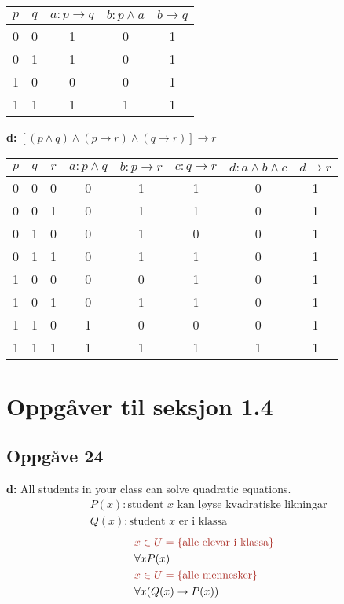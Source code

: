 \documentclass[a4paper, 11pt]{article}
\newcommand{\deloppg}[1]{\vspace{1mm}\noindent \textbf{\themecolor{#1:}}}
\newcommand{\themeshade}{Mahogany}
\newcommand{\themecolor}[1]{\textcolor{\themeshade}{#1}}
\begin{document}
\begin{tabular}{cccc|c}
    $p$ & $q$ & $a: p \rightarrow q$ & $b: p \land a$ & $b \rightarrow q$ \\
    \hline
    0   & 0   & 1                    & 0              & 1 \\
    0   & 1   & 1                    & 0              & 1 \\
    1   & 0   & 0                    & 0              & 1 \\
    1   & 1   & 1                    & 1              & 1 \\
\end{tabular}

\deloppg{d} $[(p \land q) \land (p \rightarrow r) \land (q \rightarrow r)] \rightarrow r$

\begin{tabular}{ccccccc|c}
    $p$ & $q$ & $r$ & $a: p \land q$ & $b: p \rightarrow r$
    & $c: q \rightarrow r$ & $d: a\land b\land c$ & $d \rightarrow r$ \\
    \hline
    0 & 0 & 0 & 0 & 1 & 1 & 0 & 1 \\ 
    0 & 0 & 1 & 0 & 1 & 1 & 0 & 1 \\
    0 & 1 & 0 & 0 & 1 & 0 & 0 & 1 \\
    0 & 1 & 1 & 0 & 1 & 1 & 0 & 1 \\
    1 & 0 & 0 & 0 & 0 & 1 & 0 & 1 \\
    1 & 0 & 1 & 0 & 1 & 1 & 0 & 1 \\
    1 & 1 & 0 & 1 & 0 & 0 & 0 & 1 \\
    1 & 1 & 1 & 1 & 1 & 1 & 1 & 1 \\
\end{tabular}


\newpage
\section*{Oppgåver til seksjon 1.4}

\subsection*{Oppgåve 24}

\deloppg{d} All students in your class can solve quadratic equations.
\begin{align*}
    &P(x): \text{student $x$ kan løyse kvadratiske likningar}\\
    &Q(x): \text{student $x$ er i klassa}
\end{align*}
\begin{align*}
    &\themecolor{x\in U = \{\text{alle elevar i klassa}\}} \\
    &\forall x P(x)\\
    &\themecolor{x\in U = \{ \text{alle mennesker} \}} \\
    &\forall x (Q(x)\rightarrow P(x))
\end{align*}
\end{document}
